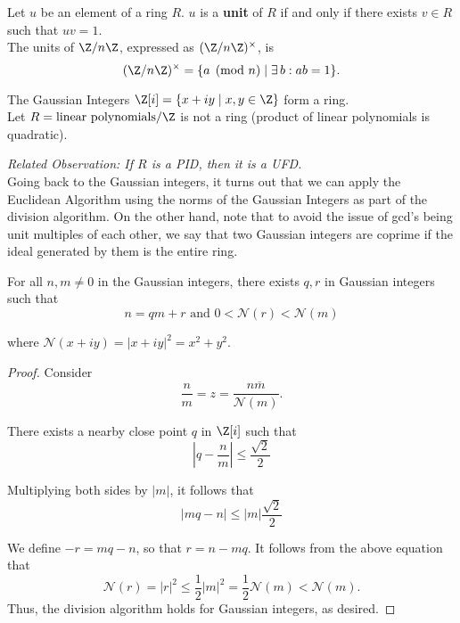 \documentclass[11pt]{article}
\begin{document}
\begin{definition}[Units]
Let $u$ be an element of a ring $R$. $u$ is a \textbf{unit} of $R$ if and only if there exists $v \in R$ such that $uv = 1$. \\

The units of $\Z / n\Z$, expressed as $(\Z / n\Z)^{\times}$, is
\[
    (\Z / n\Z)^{\times} = \{ a \pmod{n} \mid \exists \,b : ab = 1 \}.
\]
\end{definition}

\begin{exercise}
The Gaussian Integers $\Z[i] = \{ x + iy \mid x, y \in \Z \}$ form a ring. \\

Let $R = \text{linear polynomials} / \Z$ is not a ring (product of linear polynomials is quadratic).
\end{exercise}

\textit{Related Observation: If $R$ is a PID, then it is a UFD.} \\

Going back to the Gaussian integers, it turns out that we can apply the Euclidean Algorithm using the norms of the Gaussian Integers as part of the division algorithm.
On the other hand, note that to avoid the issue of gcd's being unit multiples of each other, we say that two Gaussian integers are coprime if the ideal generated by them is the entire ring.

\begin{lemma}
For all $n, m \neq 0$ in the Gaussian integers, there exists $q, r$ in Gaussian integers such that
\[
    n = qm + r \text{ and } 0 < \mathcal{N}(r) < \mathcal{N}(m)
\]

where $\mathcal{N}(x+iy) = |x+iy|^2 = x^2 + y^2$.
\end{lemma}

\begin{proof}
Consider
\[
    \frac{n}{m} = z = \frac{n \overline{m}}{\mathcal{N}(m)}.
\] 

There exists a nearby close point $q$ in $\Z[i]$ such that 
\[
    \left| q - \frac{n}{m} \right| \leq \frac{\sqrt{2}}{2}
\]

Multiplying both sides by $|m|$, it follows that
\[
    |mq - n| \leq |m|\frac{\sqrt{2}}{2}
\]

We define $-r = mq - n$, so that $r = n - mq$. It follows from the above equation that
\[
    \mathcal{N}(r) = |r|^2 \leq \frac{1}{2}|m|^2 = \frac{1}{2}\mathcal{N}(m) < \mathcal{N}(m).
\]
Thus, the division algorithm holds for Gaussian integers, as desired.
\end{proof}
\end{document}
